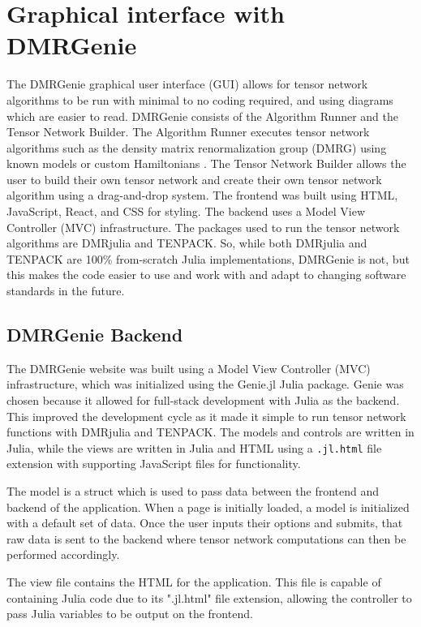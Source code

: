 \documentclass{juliacon}
\begin{document}
\section{Graphical interface with DMRGenie}
The DMRGenie graphical user interface (GUI) allows for tensor network algorithms to be run with minimal to no coding required, and using diagrams which are easier to read. DMRGenie consists of the Algorithm Runner and the Tensor Network Builder. The Algorithm Runner executes tensor network algorithms such as the density matrix renormalization group (DMRG) using known models or custom Hamiltonians \cite{dmrjulia1}. The Tensor Network Builder allows the user to build their own tensor network and create their own tensor network algorithm using a drag-and-drop system. The frontend was built using HTML, JavaScript, React, and CSS for styling. The backend uses a Model View Controller (MVC) infrastructure. The packages used to run the tensor network algorithms are DMRjulia and TENPACK. So, while both DMRjulia and TENPACK are 100\% from-scratch Julia implementations, DMRGenie is not, but this makes the code easier to use and work with and adapt to changing software standards in the future.

\subsection{DMRGenie Backend}\label{backend}
The DMRGenie website was built using a Model View Controller (MVC) infrastructure, which was initialized using the Genie.jl Julia package. Genie was chosen because it allowed for full-stack development with Julia as the backend. This improved the development cycle as it made it simple to run tensor network functions with DMRjulia and TENPACK. The models and controls are written in Julia, while the views are written in Julia and HTML using a \texttt{.jl.html} file extension with supporting JavaScript files for functionality. 

The model is a struct which is used to pass data between the frontend and backend of the application. 
When a page is initially loaded, a model is initialized with a default set of data. Once the user inputs their options and submits, that raw data is sent to the backend where tensor network computations can then be performed accordingly.

The view file contains the HTML for the application. This file is capable of containing Julia code due to its ".jl.html" file extension, allowing the controller to pass Julia variables to be output on the frontend. 
\end{document}
